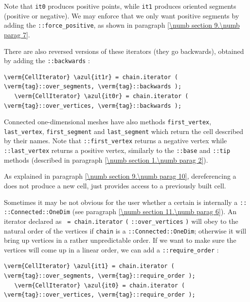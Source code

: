 Note that {\small\tt it0} produces positive points, while {\small\tt  it1} produces
oriented segments (positive or negative).
We may enforce that we only want positive segments by adding the
{\small\tt {}::force\_positive}, as shown in paragraph \ref{\numb section 9.\numb parag 7}.

There are also reversed versions of these iterators (they go backwards), obtained by adding
the {\small\tt {}::backwards} :

\begin{Verbatim}[commandchars=\\\{\},formatcom=\small\tt,
   baselinestretch=0.94,framesep=2mm                      ]
   \verm{CellIterator} \azul{it1r} = chain.iterator ( \verm{tag}::over_segments, \verm{tag}::backwards );
   \verm{CellIterator} \azul{it0r} = chain.iterator ( \verm{tag}::over_vertices, \verm{tag}::backwards );
\end{Verbatim}

Connected one-dimensional meshes have also methods {\small\tt first\_vertex},
{\small\tt last\_vertex},\break
{\small\tt first\_segment} and {\small\tt last\_segment} which return the cell described by their
names.
Note that {\small\tt {}::first\_vertex} returns a negative vertex while
{\small\tt {}::last\_vertex} returns a positive vertex, similarly to the
{\small\tt {}::base} and {\small\tt {}::tip} methods (described in paragraph
\ref{\numb section 1.\numb parag 2}).

As explained in paragraph \ref{\numb section 9.\numb parag 10},
dereferencing a {\small\tt {}} does not produce a new cell,
just provides access to a previously built cell.

Sometimes it may be not obvious for the user whether a certain {\small\tt {}}
is internally a {\small\tt {}:: ::Connected::OneDim}
(see paragraph \ref{\numb section 11.\numb parag 6}).
An iterator declared as {\small\tt {} = chain.iterator}\break
{\small\tt(} {\small\tt{}::over\_vertices} {\small\tt)} will obey to
the natural order of the vertices if {\small\tt chain} is a\break
{\small\tt {}::Connected::OneDim}; otherwise it will bring up vertices
in a rather unpredictable order.
If we want to make sure the vertices will come up in a linear order, we can add a
{\small\tt {}::require\_order} :

\begin{Verbatim}[commandchars=\\\{\},formatcom=\small\tt,
   baselinestretch=0.94,framesep=2mm                      ]
   \verm{CellIterator} \azul{it1} = chain.iterator ( \verm{tag}::over_segments, \verm{tag}::require_order );
   \verm{CellIterator} \azul{it0} = chain.iterator ( \verm{tag}::over_vertices, \verm{tag}::require_order );
\end{Verbatim}

